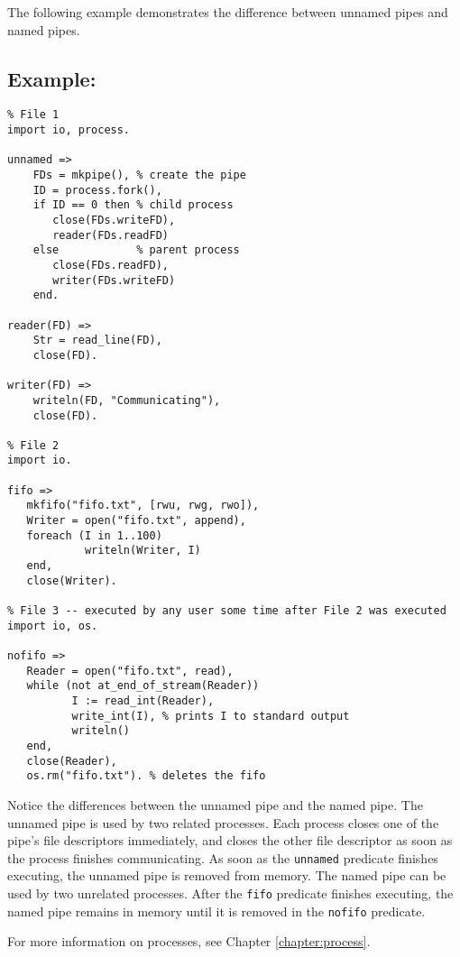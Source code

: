 {The following example demonstrates the difference between unnamed pipes and named pipes.
\subsection*{Example:}
\begin{verbatim}
% File 1
import io, process.

unnamed =>
    FDs = mkpipe(), % create the pipe
    ID = process.fork(),
    if ID == 0 then % child process
       close(FDs.writeFD),
       reader(FDs.readFD)
    else            % parent process
       close(FDs.readFD),
       writer(FDs.writeFD)
    end.
    
reader(FD) =>
    Str = read_line(FD),
    close(FD).

writer(FD) =>
    writeln(FD, "Communicating"),
    close(FD).

% File 2
import io.

fifo =>
   mkfifo("fifo.txt", [rwu, rwg, rwo]),
   Writer = open("fifo.txt", append),
   foreach (I in 1..100)
            writeln(Writer, I)
   end,
   close(Writer).

% File 3 -- executed by any user some time after File 2 was executed
import io, os.

nofifo =>
   Reader = open("fifo.txt", read),
   while (not at_end_of_stream(Reader))
          I := read_int(Reader),
          write_int(I), % prints I to standard output
          writeln()
   end,
   close(Reader),
   os.rm("fifo.txt"). % deletes the fifo
\end{verbatim}

Notice the differences between the unnamed pipe and the named pipe.  The unnamed pipe is used by two related processes.  Each process closes one of the pipe's file descriptors immediately, and closes the other file descriptor as soon as the process finishes communicating.  As soon as the \texttt{unnamed} predicate finishes executing, the unnamed pipe is removed from memory.  The named pipe can be used by two unrelated processes.  After the \texttt{fifo} predicate finishes executing, the named pipe remains in memory until it is removed in the \texttt{nofifo} predicate.

For more information on processes, see Chapter \ref{chapter:process}.

}
